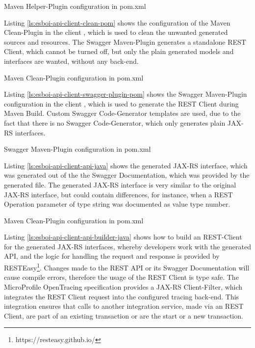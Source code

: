 \begin{listing}[h]
	\caption{Maven Helper-Plugin configuration in pom.xml}
	\label{ls:esboi-api-client-add-sources-pom}
\end{listing}

Listing \vref{ls:esboi-api-client-clean-pom} shows the configuration of the Maven Clean-Plugin in the client  , which is used to clean the unwanted generated sources and resources. The Swagger Maven-Plugin generates a standalone REST Client, which cannot be turned off, but only the plain generated models and interfaces are wanted, without any back-end. 

\begin{listing}[h]
	\caption{Maven Clean-Plugin configuration in pom.xml}
	\label{ls:esboi-api-client-clean-pom}
\end{listing}

Listing \vref{ls:esboi-api-client-swagger-plugin-pom} shows the Swagger Maven-Plugin configuration in the client , which is used to generate the REST Client during Maven Build. Custom Swagger Code-Generator templates are used, due to the fact that there is no Swagger Code-Generator, which only generates plain JAX-RS interfaces. 
\newpage

\begin{listing}[h]
	\caption{Swagger Maven-Plugin configuration in pom.xml}
	\label{ls:esboi-api-client-swagger-plugin-pom}
\end{listing}

Listing \vref{ls:esboi-api-client-api-java} shows the generated JAX-RS interface, which was generated out of the the Swagger Documentation, which was provided by the generated  file. The generated JAX-RS interface is very similar to the original JAX-RS interface, but could contain differences, for instance, when a REST Operation parameter of type string was documented as value type number.

\begin{listing}[h]
	\caption{Maven Clean-Plugin configuration in pom.xml}
	\label{ls:esboi-api-client-api-java}
\end{listing}

Listing \vref{ls:esboi-api-client-api-builder-java} shows how to build an REST-Client for the generated JAX-RS interfaces, whereby developers work with the generated API, and the logic for handling the request and response is provided by RESTEasy\footnote{https://resteasy.github.io/}. Changes made to the REST API or its Swagger Documentation will cause compile errors, therefore the usage of the REST Client is type safe. The MicroProfile OpenTracing specification provides a JAX-RS Client-Filter, which integrates the REST Client request into the configured tracing back-end. This integration ensures that calls to another integration service, made via an REST Client, are part of an existing transaction or are the start or a new transaction.

